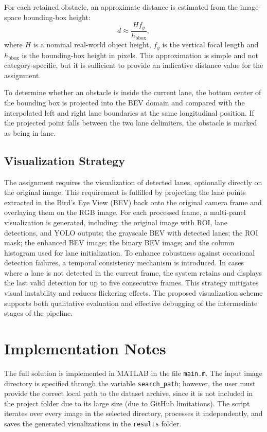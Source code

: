\documentclass[conference]{IEEEtran}
\begin{document}
For each retained obstacle, an approximate distance is estimated from the image-space bounding-box height:
\begin{equation}
d \approx \frac{H f_y}{h_{\text{bbox}}},
\end{equation}
where $H$ is a nominal real-world object height, $f_y$ is the vertical focal length and $h_{\text{bbox}}$ is the bounding-box height in pixels. This approximation is simple and not category-specific, but it is sufficient to provide an indicative distance value for the assignment.

To determine whether an obstacle is inside the current lane, the bottom center of the bounding box is projected into the BEV domain and compared with the interpolated left and right lane boundaries at the same longitudinal position. If the projected point falls between the two lane delimiters, the obstacle is marked as being in-lane.

\subsection{Visualization Strategy}
The assignment requires the visualization of detected lanes, optionally directly on the original image. This requirement is fulfilled by projecting the lane points extracted in the Bird’s Eye View (BEV) back onto the original camera frame and overlaying them on the RGB image.
For each processed frame, a multi-panel visualization is generated, including: the original image with ROI, lane detections, and YOLO outputs; the grayscale BEV with detected lanes; the ROI mask; the enhanced BEV image; the binary BEV image; and the column histogram used for lane initialization.
To enhance robustness against occasional detection failures, a temporal consistency mechanism is introduced. In cases where a lane is not detected in the current frame, the system retains and displays the last valid detection for up to five consecutive frames. This strategy mitigates visual instability and reduces flickering effects.
The proposed visualization scheme supports both qualitative evaluation and effective debugging of the intermediate stages of the pipeline.


\section{Implementation Notes}
The full solution is implemented in MATLAB in the file \texttt{main.m}. The input image directory is specified through the variable \texttt{search\_path}; however, the user must provide the correct local path to the dataset archive, since it is not included in the project folder due to its large size (due to GitHub limitations). The script iterates over every image in the selected directory, processes it independently, and saves the generated visualizations in the \texttt{results} folder.
\end{document}
